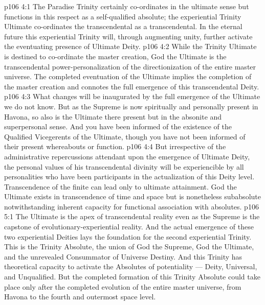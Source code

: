 \vs p106 4:1 The Paradise Trinity certainly co\hyp{}ordinates in the ultimate sense but functions in this respect as a self\hyp{}qualified absolute; the experiential Trinity Ultimate co\hyp{}ordinates the transcendental as a transcendental. In the eternal future this experiential Trinity will, through augmenting unity, further activate the eventuating presence of Ultimate Deity.
\vs p106 4:2 While the Trinity Ultimate is destined to co\hyp{}ordinate the master creation, God the Ultimate is the transcendental power\hyp{}personalization of the directionization of the entire master universe. The completed eventuation of the Ultimate implies the completion of the master creation and connotes the full emergence of this transcendental Deity.
\vs p106 4:3 What changes will be inaugurated by the full emergence of the Ultimate we do not know. But as the Supreme is now spiritually and personally present in Havona, so also is the Ultimate there present but in the absonite and superpersonal sense. And you have been informed of the existence of the Qualified Vicegerents of the Ultimate, though you have not been informed of their present whereabouts or function.
\vs p106 4:4 But irrespective of the administrative repercussions attendant upon the emergence of Ultimate Deity, the personal values of his transcendental divinity will be experiencible by all personalities who have been participants in the actualization of this Deity level. Transcendence of the finite can lead only to ultimate attainment. God the Ultimate exists in transcendence of time and space but is nonetheless subabsolute notwithstanding inherent capacity for functional association with absolutes.
\vs p106 5:1 The Ultimate is the apex of transcendental reality even as the Supreme is the capstone of evolutionary\hyp{}experiential reality. And the actual emergence of these two experiential Deities lays the foundation for the second experiential Trinity. This is the Trinity Absolute, the union of God the Supreme, God the Ultimate, and the unrevealed Consummator of Universe Destiny. And this Trinity has theoretical capacity to activate the Absolutes of potentiality --- Deity, Universal, and Unqualified. But the completed formation of this Trinity Absolute could take place only after the completed evolution of the entire master universe, from Havona to the fourth and outermost space level.
